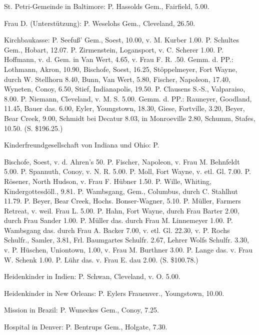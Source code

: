 St. Petri-Gemeinde in Baltimore: P. Hassolds Gem., Fairfield, 5.00.

Frau D. (Unterstützung): P. Weselohs Gem., Cleveland, 26.50.

Kirchbaukasse: P. Seefuß’ Gem., Soest, 10.00, v. M. Kurber 1.00. P. Schultes Gem., Hobart, 12.07. P. Zirmenstein, Logansport, v. C. Scherer 1.00. P. Hoffmann, v. d. Gem. in Van Wert, 4.65, v. Frau F. R. .50. Gemm. d. PP.: Lothmann, Akron, 10.90, Bischofe, Soest, 16.25, Stöppelmeyer, Fort Wayne, durch W. Stellhorn 8.40, Bunn, Van Wert, 5.80, Fischer, Napoleon, 17.40, Wyneten, Conoy, 6.50, Stief, Indianapolis, 19.50. P. Clausens S.-S., Valparaiso, 8.00. P. Niemann, Cleveland, v. M. S. 5.00. Gemm. d. PP.: Rauneyer, Goodland, 11.45, Bauer das. 6.00, Eyler, Youngstown, 18.30, Giese, Fortville, 3.20, Beyer, Bear Creek, 9.00, Schmidt bei Decatur 8.03, in Monroeville 2.80, Schumm, Stafes, 10.50. (S. \$196.25.)

Kinderfreundgesellschaft von Indiana und Ohio: P.

Bischofe, Soest, v. d. Ahren’s 50. P. Fischer, Napoleon, v. Frau M. Behnfeldt 5.00. P. Spannuth, Conoy, v. N. R. 5.00. P. Moll, Fort Wayne, v. etl. Gl. 7.00. P. Rösener, North Hudson, v. Frau F. Hübner 1.50. P. Wille, Whiting, Kindergottesdöll., 9.81. P. Wambsgang, Gem., Columbus, durch C. Stahlhut 11.79. P. Beyer, Bear Creek, Hochs. Bonser-Wagner, 5.10. P. Müller, Farmers Retreat, v. weil. Frau L. 5.00. P. Hahn, Fort Wayne, durch Frau Barter 2.00, durch Frau Sander 1.00. P. Müller das. durch Frau M. Linnemeyer 1.00. P. Wambsgang das. durch Frau A. Backer 7.00, v. etl. Gl. 22.30, v. P. Rochs Schulfr., Samler, 3.81, Frl. Baumgartes Schulfr. 2.67, Lehrer Wolfs Schulfr. 3.30, v. P. Hüschen, Uniontown, 1.00, v. Frau M. Burthner 3.00. P. Lange das. v. Frau W. Schenk 1.00. P. Lühr das. v. Frau E. dau 2.00. (S. \$100.78.)

Heidenkinder in Indien: P. Schwan, Cleveland, v. O. 5.00.

Heidenkinder in New Orleans: P. Eylers Frauenver., Youngstown, 10.00.

Mission in Brazil: P. Wuneckes Gem., Conoy, 7.25.

Hospital in Denver: P. Bentrups Gem., Holgate, 7.30.

